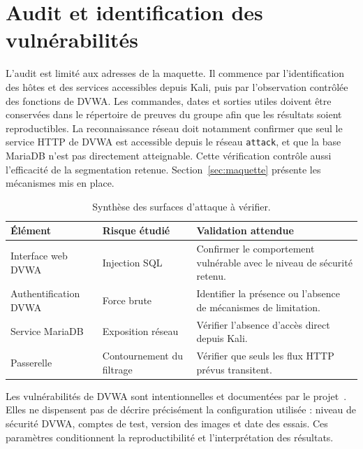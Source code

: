 \section{Audit et identification des vulnérabilités}\label{sec:audit}

L'audit est limité aux adresses de la maquette.
Il commence par l'identification des hôtes et des services accessibles depuis Kali, puis par l'observation contrôlée des fonctions de DVWA\@.
Les commandes, dates et sorties utiles doivent être conservées dans le répertoire de preuves du groupe afin que les résultats soient reproductibles.
La reconnaissance réseau doit notamment confirmer que seul le service HTTP de DVWA est accessible depuis le réseau \texttt{attack}, et que la base MariaDB n'est pas directement atteignable.
Cette vérification contrôle aussi l'efficacité de la segmentation retenue.
Section~\ref{sec:maquette} présente les mécanismes mis en place.

\begin{table}[H]
    \centering
    \caption{Synthèse des surfaces d'attaque à vérifier.}\label{tab:audit}
    \begin{tabular}{@{}p{}p{}p{}@{}}
        \toprule
        Élément & Risque étudié & Validation attendue \\
        \midrule
        Interface web DVWA & Injection SQL & Confirmer le comportement vulnérable avec le niveau de sécurité retenu. \\
        Authentification DVWA & Force brute & Identifier la présence ou l'absence de mécanismes de limitation. \\
        Service MariaDB & Exposition réseau & Vérifier l'absence d'accès direct depuis Kali. \\
        Passerelle & Contournement du filtrage & Vérifier que seuls les flux HTTP prévus transitent. \\
        \bottomrule
    \end{tabular}
\end{table}

Les vulnérabilités de DVWA sont intentionnelles et documentées par le projet~\cite{dvwa}.
Elles ne dispensent pas de décrire précisément la configuration utilisée : niveau de sécurité DVWA, comptes de test, version des images et date des essais.
Ces paramètres conditionnent la reproductibilité et l'interprétation des résultats.
